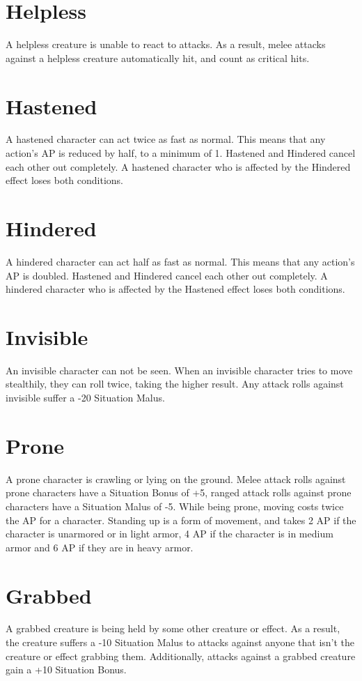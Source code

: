 \section{Helpless}\label{condition:helpless}
A helpless creature is unable to react to attacks.
As a result, melee attacks against a helpless creature automatically hit, and count as critical hits.

\section{Hastened}\label{condition:hastened}
A hastened character can act twice as fast as normal.
This means that any action's AP is reduced by half, to a minimum of 1.
Hastened and Hindered cancel each other out completely.
A hastened character who is affected by the Hindered effect loses both conditions.

\section{Hindered}\label{condition:hindered}
A hindered character can act half as fast as normal.
This means that any action's AP is doubled.
Hastened and Hindered cancel each other out completely.
A hindered character who is affected by the Hastened effect loses both conditions.

\section{Invisible}\label{condition:invisible}
An invisible character can not be seen.
When an invisible character tries to move stealthily, they can roll twice, taking the higher result.
Any attack rolls against invisible suffer a -20 Situation Malus.

\section{Prone}\label{condition:prone}
A prone character is crawling or lying on the ground.
Melee attack rolls against prone characters have a Situation Bonus of +5, ranged attack rolls against prone characters have a Situation Malus of -5.
While being prone, moving costs twice the AP for a character.
Standing up is a form of movement, and takes 2 AP if the character is unarmored or in light armor, 4 AP if the character is in medium armor and 6 AP if they are in heavy armor.

\section{Grabbed}\label{condition:grabbed}
A grabbed creature is being held by some other creature or effect.
As a result, the creature suffers a -10 Situation Malus to attacks against anyone that isn't the creature or effect grabbing them.
Additionally, attacks against a grabbed creature gain a +10 Situation Bonus.

